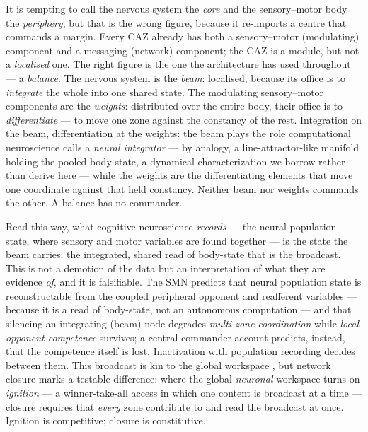 \documentclass{article}
\begin{document}
It is tempting to call the nervous system the \emph{core} and the
sensory--motor body the \emph{periphery}, but that is the wrong figure,
because it re-imports a centre that commands a margin.  Every CAZ already
has both a sensory--motor (modulating) component and a messaging (network)
component; the CAZ is a module, but not a \emph{localised} one.  The right
figure is the one the architecture has used throughout --- a
\emph{balance}.  The nervous system is the \emph{beam}: localised, because
its office is to \emph{integrate} the whole into one shared state.  The
modulating sensory--motor components are the \emph{weights}: distributed
over the entire body, their office is to \emph{differentiate} --- to move
one zone against the constancy of the rest.  Integration on the beam,
differentiation at the weights: the beam plays the role computational
neuroscience calls a \emph{neural integrator} --- by analogy, a
line-attractor-like manifold holding the pooled body-state, a dynamical
characterization we borrow rather than derive here --- while the weights are the
differentiating elements that move one coordinate against that held constancy.  Neither beam nor weights
commands the other.  A balance has no commander.

Read this way, what cognitive neuroscience \emph{records} --- the neural
population state, where sensory and motor variables are found together ---
is the state the beam carries: the integrated, shared read of body-state
that is the broadcast.  This is not a demotion of the data but an
interpretation of what they are evidence \emph{of}, and it is falsifiable.
The SMN predicts that neural population state is reconstructable from the
coupled peripheral opponent and reafferent variables --- because it is a
read of body-state, not an autonomous computation --- and that silencing an
integrating (beam) node degrades \emph{multi-zone coordination} while
\emph{local opponent competence} survives; a central-commander account
predicts, instead, that the competence itself is lost.  Inactivation with
population recording decides between them.  This broadcast is kin to the
global workspace \citep{Baars2005GlobalWorkspace,Dehaene2014Consciousness},
but network closure marks a testable difference: where the global
\emph{neuronal} workspace turns on \emph{ignition} --- a winner-take-all
access in which one content is broadcast at a time --- closure requires
that \emph{every} zone contribute to and read the broadcast at once.
Ignition is competitive; closure is constitutive.
\end{document}
